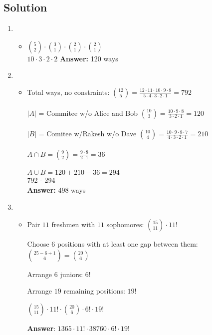 \documentclass[11pt]{article}
\begin{document}
    \subsection*{Solution}
    \begin{enumerate}[label=(\alph*)]
        \item
        \begin{itemize}
            \item[] \(\binom{5}{2} \cdot \binom{3}{1} \cdot \binom{2}{1} \cdot \binom{2}{1}\) \\ 
            \(10 \cdot 3 \cdot 2 \cdot 2\)
            \textbf{Answer:} 120 ways
        \end{itemize}
        \item
        \begin{itemize}
            \item[] Total ways, no constraints: \(\binom{12}{5} = \frac{12 \cdot 11 \cdot10 \cdot9 \cdot 8}{5 \cdot4 \cdot3 \cdot2 \cdot1} = 792\) \\ \\
        \(|A|\) = Commitee w/o Alice and Bob \(\binom{10}{3} = \frac{10 \cdot9 \cdot8}{3 \cdot2 \cdot1} = 120\) \\ \\
        \(|B|\) = Comitee w/Rakesh w/o Dave \(\binom{10}{4} = \frac{10 \cdot9 \cdot8 \cdot7}{4 \cdot3 \cdot2 \cdot1} = 210\) \\ \\
        \(A \cap B = \binom{9}{2} = \frac{9 \cdot8}{2 \cdot 1} = 36\) \\ \\ 
        \(A \cup B = 120 + 210 -36 = 294\) \\ 
        792 - 294 \\
        \textbf{Answer:} 498 ways 
        \end{itemize}
        \item
        \begin{itemize}
            \item[] 

Pair $11$ freshmen with $11$ sophomores:
\(
\binom{15}{11} \cdot 11!
\) 

Choose $6$ positions with at least one gap between them:
\(
\binom{25 - 6 + 1}{6} = \binom{20}{6}
\) 

Arrange $6$ juniors:
\(
6!
\)

Arrange $19$ remaining positions:
\(
19!
\)

\(
\binom{15}{11} \cdot 11! \cdot \binom{20}{6} \cdot 6! \cdot 19!
\)

\textbf{Answer}:
\(
1365 \cdot 11! \cdot 38760 \cdot 6! \cdot 19!
\)

            
        \end{itemize}
    \end{enumerate}
\end{document}

